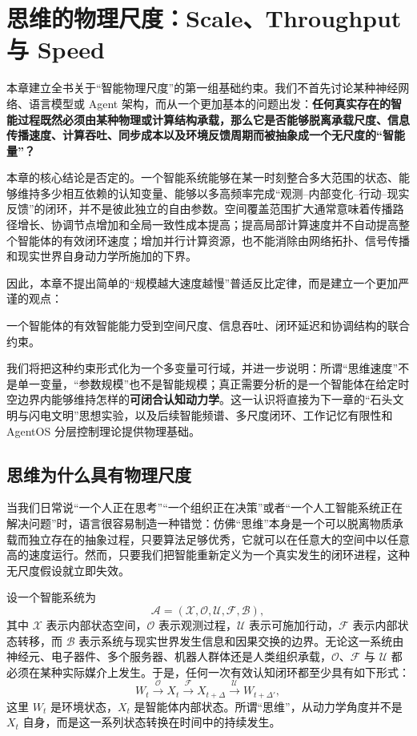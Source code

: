 \chapter{思维的物理尺度：Scale、Throughput 与 Speed}
\label{chap:physical-scale-of-intelligence}

\begin{chapterlead}
本章建立全书关于“智能物理尺度”的第一组基础约束。我们不首先讨论某种神经网络、语言模型或 Agent 架构，而从一个更加基本的问题出发：\textbf{任何真实存在的智能过程既然必须由某种物理或计算结构承载，那么它是否能够脱离承载尺度、信息传播速度、计算吞吐、同步成本以及环境反馈周期而被抽象成一个无尺度的“智能量”？}

本章的核心结论是否定的。一个智能系统能够在某一时刻整合多大范围的状态、能够维持多少相互依赖的认知变量、能够以多高频率完成“观测--内部变化--行动--现实反馈”的闭环，并不是彼此独立的自由参数。空间覆盖范围扩大通常意味着传播路径增长、协调节点增加和全局一致性成本提高；提高局部计算速度并不自动提高整个智能体的有效闭环速度；增加并行计算资源，也不能消除由网络拓扑、信号传播和现实世界自身动力学所施加的下界。

因此，本章不提出简单的“规模越大速度越慢”普适反比定律，而是建立一个更加严谨的观点：

\begin{statementbox}
一个智能体的有效智能能力受到空间尺度、信息吞吐、闭环延迟和协调结构的联合约束。
\end{statementbox}

我们将把这种约束形式化为一个多变量可行域，并进一步说明：所谓“思维速度”不是单一变量，“参数规模”也不是智能规模；真正需要分析的是一个智能体在给定时空边界内能够维持怎样的\textbf{可闭合认知动力学}。这一认识将直接为下一章的“石头文明与闪电文明”思想实验，以及后续智能频谱、多尺度闭环、工作记忆有限性和 AgentOS 分层控制理论提供物理基础。
\end{chapterlead}

\section{思维为什么具有物理尺度}

当我们日常说“一个人正在思考”“一个组织正在决策”或者“一个人工智能系统正在解决问题”时，语言很容易制造一种错觉：仿佛“思维”本身是一个可以脱离物质承载而独立存在的抽象过程，只要算法足够优秀，它就可以在任意大的空间中以任意高的速度运行。然而，只要我们把智能重新定义为一个真实发生的闭环进程，这种无尺度假设就立即失效。

设一个智能系统为
\[
\mathcal{A}
=
\left(
\mathcal{X},
\mathcal{O},
\mathcal{U},
\mathcal{F},
\mathcal{B}
\right),
\]
其中 $\mathcal{X}$ 表示内部状态空间，$\mathcal{O}$ 表示观测过程，$\mathcal{U}$ 表示可施加行动，$\mathcal{F}$ 表示内部状态转移，而 $\mathcal{B}$ 表示系统与现实世界发生信息和因果交换的边界。无论这一系统由神经元、电子器件、多个服务器、机器人群体还是人类组织承载，$\mathcal{O}$、$\mathcal{F}$ 与 $\mathcal{U}$ 都必须在某种实际媒介上发生。于是，任何一次有效认知闭环都至少具有如下形式：
\[
W_t
\xrightarrow{\mathcal O}
X_t
\xrightarrow{\mathcal F}
X_{t+\Delta}
\xrightarrow{\mathcal U}
W_{t+\Delta'},
\]
这里 $W_t$ 是环境状态，$X_t$ 是智能体内部状态。所谓“思维”，从动力学角度并不是 $X_t$ 自身，而是这一系列状态转换在时间中的持续发生。

